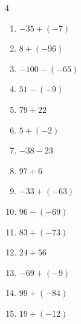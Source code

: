 \begin{multicols}{4}
\begin{enumerate}
        \phantom{$=-84$}

  \item $-35+(-7)$

        \phantom{$=-42$}

  \item $8+(-96)$

        \phantom{$=-88$}

  \item $-100-(-65)$

        \phantom{$=-35$}

  \item $51-(-9)$

        \phantom{$=60$}

  \item $79+22$

        \phantom{$=101$}

  \item $5+(-2)$

        \phantom{$=3$}

  \item $-38-23$

        \phantom{$=-61$}

  \item $97+6$

        \phantom{$=103$}

  \item $-33+(-63)$

        \phantom{$=-96$}

\columnbreak %

\resetques

  \item $96-(-69)$

        \phantom{$=165$}

  \item $83+(-73)$

        \phantom{$=10$}

  \item $24+56$

        \phantom{$=80$}

  \item $-69+(-9)$

        \phantom{$=-78$}

  \item $99+(-84)$

        \phantom{$=15$}

  \item $19+(-12)$

        \phantom{$=7$}


\end{enumerate}
\end{multicols}
